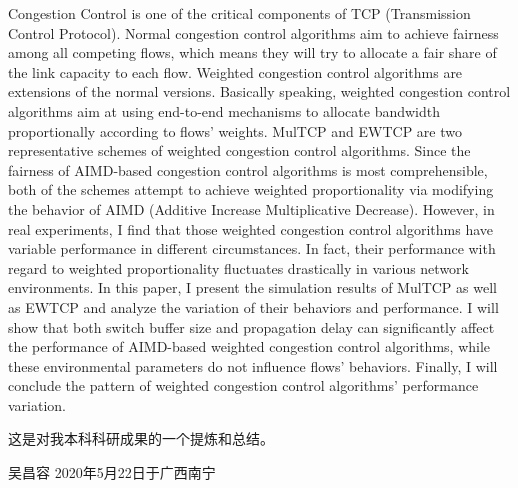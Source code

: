 \documentclass[winfonts]{njuthesis}
\begin{document}
\begin{englishabstract}
  Congestion Control is one of the critical components of TCP (Transmission Control Protocol). Normal congestion control algorithms aim to achieve fairness among all competing flows, which means they will try to allocate a fair share of the link capacity to each flow. Weighted congestion control algorithms are extensions of the normal versions. Basically speaking, weighted congestion control algorithms aim at using end-to-end mechanisms to allocate bandwidth proportionally according to flows’ weights. MulTCP and EWTCP are two representative schemes of weighted congestion control algorithms. Since the fairness of AIMD-based congestion control algorithms is most comprehensible, both of the schemes attempt to achieve weighted proportionality via modifying the behavior of AIMD (Additive Increase Multiplicative Decrease). However, in real experiments, I find that those weighted congestion control algorithms have variable performance in different circumstances. In fact, their performance with regard to weighted proportionality fluctuates drastically in various network environments. In this paper, I present the simulation results of MulTCP as well as EWTCP and analyze the variation of their behaviors and performance. I will show that both switch buffer size and propagation delay can significantly affect the performance of AIMD-based weighted congestion control algorithms, while these environmental parameters do not influence flows’ behaviors. Finally, I will conclude the pattern of weighted congestion control algorithms’ performance variation. 
\end{englishabstract}

%
\begin{preface}

这是对我本科科研成果的一个提炼和总结。

\vspace{1cm}
\begin{flushright}
吴昌容
2020年5月22日于广西南宁
\end{flushright}

\end{preface}
\end{document}

